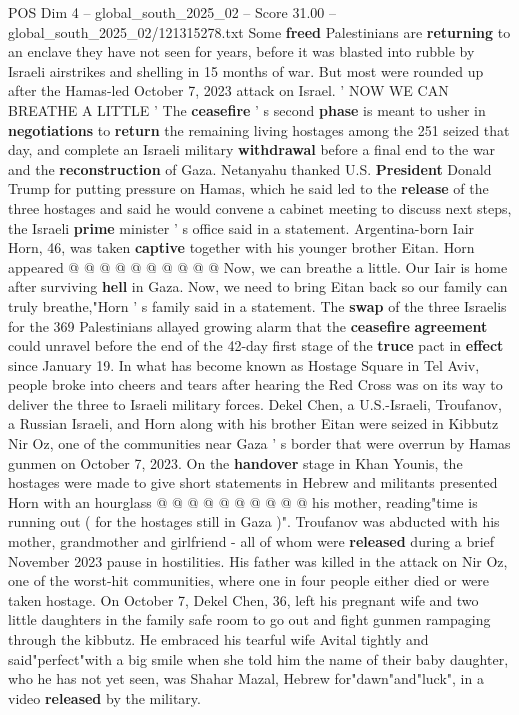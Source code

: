 \begin{textsample}{POS Dim 4 – global\_south\_2025\_02 – Score 31.00 – global\_south\_2025\_02/121315278.txt}
Some \textbf{freed} Palestinians are \textbf{returning} to an enclave they have not seen for years, before it was blasted into rubble by Israeli airstrikes and shelling in 15 months of war.
But most were rounded up after the Hamas-led October 7, 2023 attack on Israel. ' NOW WE CAN BREATHE A LITTLE ' The \textbf{ceasefire} ' s second \textbf{phase} is meant to usher in \textbf{negotiations} to \textbf{return} the remaining living hostages among the 251 seized that day, and complete an Israeli military \textbf{withdrawal} before a final end to the war and the \textbf{reconstruction} of Gaza.
Netanyahu thanked U.S. \textbf{President} Donald Trump for putting pressure on Hamas, which he said led to the \textbf{release} of the three hostages and said he would convene a cabinet meeting to discuss next steps, the Israeli \textbf{prime} minister ' s office said in a statement.
Argentina-born Iair Horn, 46, was taken \textbf{captive} together with his younger brother Eitan.
Horn appeared @ @ @ @ @ @ @ @ @ @ Now, we can breathe a little.
Our Iair is home after surviving \textbf{hell} in Gaza.
Now, we need to bring Eitan back so our family can truly breathe,"Horn ' s family said in a statement.
The \textbf{swap} of the three Israelis for the 369 Palestinians allayed growing alarm that the \textbf{ceasefire} \textbf{agreement} could unravel before the end of the 42-day first stage of the \textbf{truce} pact in \textbf{effect} since January 19.
In what has become known as Hostage Square in Tel Aviv, people broke into cheers and tears after hearing the Red Cross was on its way to deliver the three to Israeli military forces.
Dekel Chen, a U.S.-Israeli, Troufanov, a Russian Israeli, and Horn along with his brother Eitan were seized in Kibbutz Nir Oz, one of the communities near Gaza ' s border that were overrun by Hamas gunmen on October 7, 2023.
On the \textbf{handover} stage in Khan Younis, the hostages were made to give short statements in Hebrew and militants presented Horn with an hourglass @ @ @ @ @ @ @ @ @ @ his mother, reading"time is running out ( for the hostages still in Gaza )".
Troufanov was abducted with his mother, grandmother and girlfriend - all of whom were \textbf{released} during a brief November 2023 pause in hostilities.
His father was killed in the attack on Nir Oz, one of the worst-hit communities, where one in four people either died or were taken hostage.
On October 7, Dekel Chen, 36, left his pregnant wife and two little daughters in the family safe room to go out and fight gunmen rampaging through the kibbutz.
He embraced his tearful wife Avital tightly and said"perfect"with a big smile when she told him the name of their baby daughter, who he has not yet seen, was Shahar Mazal, Hebrew for"dawn"and"luck", in a video \textbf{released} by the military.

\end{textsample}

